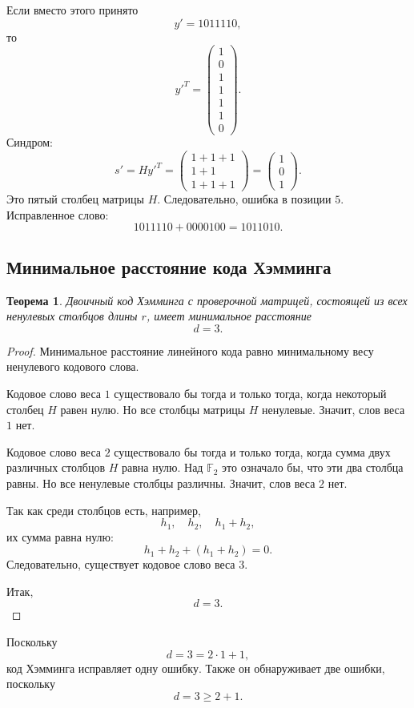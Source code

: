 \documentclass[12pt,a4paper]{article}
\newtheorem{theorem}{Теорема}[section]
\newcommand{\F}{\mathbb{F}}
\begin{document}
Если вместо этого принято
\[
    y'=1011110,
\]
то
\[
y'^T=
\begin{pmatrix}
1\\0\\1\\1\\1\\1\\0
\end{pmatrix}.
\]
Синдром:
\[
s'=Hy'^T
=
\begin{pmatrix}
1+1+1\\
1+1\\
1+1+1
\end{pmatrix}
=
\begin{pmatrix}
1\\0\\1
\end{pmatrix}.
\]
Это пятый столбец матрицы $H$.
Следовательно, ошибка в позиции $5$.
Исправленное слово:
\[
    1011110 + 0000100 = 1011010.
\]

\subsection{Минимальное расстояние кода Хэмминга}

\begin{theorem}
Двоичный код Хэмминга с проверочной матрицей, состоящей из всех ненулевых столбцов длины $r$, имеет минимальное расстояние
\[
    d=3.
\]
\end{theorem}

\begin{proof}
Минимальное расстояние линейного кода равно минимальному весу ненулевого кодового слова.

Кодовое слово веса $1$ существовало бы тогда и только тогда, когда некоторый столбец $H$ равен нулю.
Но все столбцы матрицы $H$ ненулевые.
Значит, слов веса $1$ нет.

Кодовое слово веса $2$ существовало бы тогда и только тогда, когда сумма двух различных столбцов $H$ равна нулю.
Над $\F_2$ это означало бы, что эти два столбца равны.
Но все ненулевые столбцы различны.
Значит, слов веса $2$ нет.

Так как среди столбцов есть, например,
\[
    h_1,\quad h_2,\quad h_1+h_2,
\]
их сумма равна нулю:
\[
    h_1+h_2+(h_1+h_2)=0.
\]
Следовательно, существует кодовое слово веса $3$.

Итак,
\[
    d=3.
\]
\end{proof}

Поскольку
\[
    d=3=2\cdot 1+1,
\]
код Хэмминга исправляет одну ошибку.
Также он обнаруживает две ошибки, поскольку
\[
    d=3\ge 2+1.
\]
\end{document}
